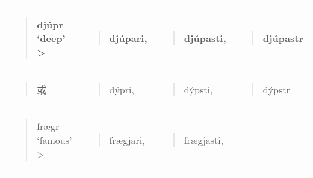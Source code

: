 \begin{longtable}{llll}
\toprule
\begin{quote}djúpr `deep‌' \textgreater{}\end{quote} & \begin{quote}djúpari,\end{quote} & \begin{quote}djúpasti,\end{quote} & \begin{quote}djúpastr\end{quote} \\
\midrule
\endhead
\bottomrule
\endfoot
\begin{minipage}[t]{\linewidth}\raggedright
\begin{quote}
或
\end{quote}
\end{minipage} & \begin{minipage}[t]{\linewidth}\raggedright
\begin{quote}
dýpri,
\end{quote}
\end{minipage} & \begin{minipage}[t]{\linewidth}\raggedright
\begin{quote}
dýpsti,
\end{quote}
\end{minipage} & \begin{minipage}[t]{\linewidth}\raggedright
\begin{quote}
dýpstr
\end{quote}
\end{minipage} \\
\begin{minipage}[t]{\linewidth}\raggedright
\begin{quote}
frægr `famous‌' \textgreater{}
\end{quote}
\end{minipage} & \begin{minipage}[t]{\linewidth}\raggedright
\begin{quote}
frægjari,
\end{quote}
\end{minipage} & \begin{minipage}[t]{\linewidth}\raggedright
\begin{quote}
frægjasti,
\end{quote}
\end{minipage} & \begin{minipage}[t]{\linewidth}\raggedright
\begin{quote}

\end{quote}
\end{minipage}
\end{longtable}
